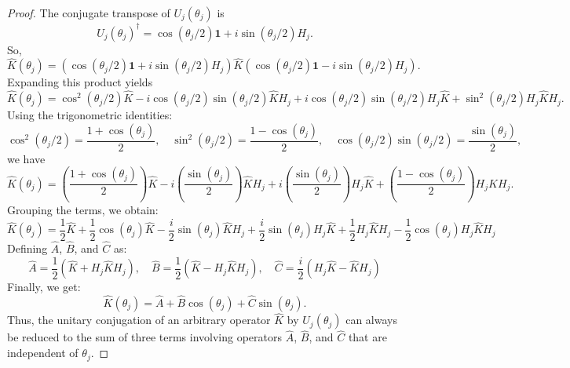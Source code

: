 \begin{proof}
 The conjugate transpose of $U_j(\theta_j)$ is
\begin{equation}
    U_j(\theta_j)^{\dagger} = \cos \left(\theta_j / 2\right) \textbf{1} + i \sin \left(\theta_j / 2\right) H_j.
\end{equation}
So,
\begin{equation}
    \hat{K}(\theta_j) = \left( \cos \left(\theta_j / 2\right) \textbf{1} + i \sin \left(\theta_j / 2\right) H_j \right) \hat{K} \left( \cos \left(\theta_j / 2\right) \textbf{1} - i \sin \left(\theta_j / 2\right) H_j \right).
\end{equation}
Expanding this product yields
\begin{equation}
    \hat{K}(\theta_j) = \cos^2 \left(\theta_j / 2\right) \hat{K} - i \cos \left(\theta_j / 2\right) \sin \left(\theta_j / 2\right) \hat{K} H_j + i \cos \left(\theta_j / 2\right) \sin \left(\theta_j / 2\right) H_j \hat{K} + \sin^2 \left(\theta_j / 2\right) H_j \hat{K} H_j.
\end{equation}
Using the trigonometric identities:
\begin{equation}
    \cos^2 \left(\theta_j / 2\right) = \frac{1 + \cos(\theta_j)}{2}, \quad \sin^2 \left(\theta_j / 2\right) = \frac{1 - \cos(\theta_j)}{2}, \quad \cos \left(\theta_j / 2\right) \sin \left(\theta_j / 2\right) = \frac{\sin(\theta_j)}{2},
\end{equation}
we have
\begin{equation}
    \hat{K}(\theta_j) = \left( \frac{1 + \cos(\theta_j)}{2} \right) \hat{K} - i \left( \frac{\sin(\theta_j)}{2} \right) \hat{K} H_j + i \left( \frac{\sin(\theta_j)}{2} \right) H_j \hat{K} + \left( \frac{1 - \cos(\theta_j)}{2} \right) H_j \hat{K} H_j.
\end{equation}
Grouping the terms, we obtain:
\begin{equation}
    \hat{K}(\theta_j) = \frac{1}{2} \hat{K} + \frac{1}{2} \cos(\theta_j) \hat{K} - \frac{i}{2} \sin(\theta_j) \hat{K} H_j + \frac{i}{2} \sin(\theta_j) H_j \hat{K} + \frac{1}{2} H_j \hat{K} H_j - \frac{1}{2} \cos(\theta_j) H_j \hat{K} H_j
\end{equation}
Defining $\hat{A}$, $\hat{B}$, and $\hat{C}$ as:
\begin{equation}
    \hat{A} = \frac{1}{2} (\hat{K} + H_j \hat{K} H_j), \quad \hat{B} = \frac{1}{2} (\hat{K} - H_j \hat{K} H_j), \quad \hat{C} = \frac{i}{2} (H_j \hat{K} - \hat{K} H_j)
\end{equation}
Finally, we get:
\begin{equation}
    \hat{K}(\theta_j) = \hat{A} + \hat{B} \cos(\theta_j) + \hat{C} \sin(\theta_j).
\end{equation}
Thus, the unitary conjugation of an arbitrary operator $\hat{K}$ by $U_j(\theta_j)$ can always be reduced to the sum of three terms involving operators $\hat{A}$, $\hat{B}$, and $\hat{C}$ that are independent of $\theta_j$.
\end{proof}

